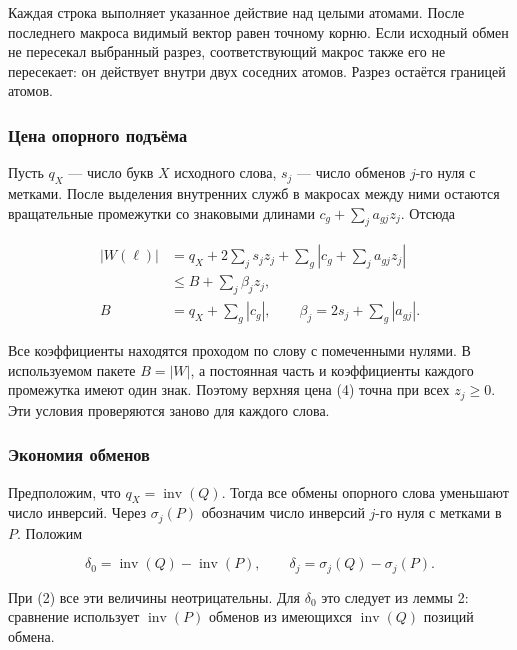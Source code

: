 \documentclass[
  11pt,
  a4paper,
]{article}
\begin{document}
Каждая строка выполняет указанное действие над целыми атомами. После
последнего макроса видимый вектор равен точному корню. Если исходный
обмен не пересекал выбранный разрез, соответствующий макрос также его не
пересекает: он действует внутри двух соседних атомов. Разрез остаётся
границей атомов.

\hypertarget{ux446ux435ux43dux430-ux43eux43fux43eux440ux43dux43eux433ux43e-ux43fux43eux434ux44aux451ux43cux430}{%
\subsubsection{Цена опорного
подъёма}\label{ux446ux435ux43dux430-ux43eux43fux43eux440ux43dux43eux433ux43e-ux43fux43eux434ux44aux451ux43cux430}}

Пусть \(q_X\) --- число букв \(X\) исходного слова, \(s_j\) --- число
обменов \(j\)-го нуля с метками. После выделения внутренних служб в
макросах между ними остаются вращательные промежутки со знаковыми
длинами \(c_g+\sum_j a_{gj}z_j\). Отсюда

\[\begin{aligned}
|W(\ell)|&=q_X+2\sum_js_jz_j+
\sum_g\left|c_g+\sum_ja_{gj}z_j\right|\\
&\le B+\sum_j\beta_jz_j,\\
B&=q_X+\sum_g|c_g|,\qquad
\beta_j=2s_j+\sum_g|a_{gj}|.
\end{aligned}\tag{4}\]

Все коэффициенты находятся проходом по слову с помеченными нулями. В
используемом пакете \(B=|W|\), а постоянная часть и коэффициенты каждого
промежутка имеют один знак. Поэтому верхняя цена (4) точна при всех
\(z_j\ge0\). Эти условия проверяются заново для каждого слова.

\hypertarget{ux44dux43aux43eux43dux43eux43cux438ux44f-ux43eux431ux43cux435ux43dux43eux432}{%
\subsubsection{Экономия
обменов}\label{ux44dux43aux43eux43dux43eux43cux438ux44f-ux43eux431ux43cux435ux43dux43eux432}}

Предположим, что \(q_X=\operatorname{inv}(Q)\). Тогда все обмены
опорного слова уменьшают число инверсий. Через \(\sigma_j(P)\) обозначим
число инверсий \(j\)-го нуля с метками в \(P\). Положим

\[\delta_0=\operatorname{inv}(Q)-\operatorname{inv}(P),\qquad
\delta_j=\sigma_j(Q)-\sigma_j(P).\tag{5}\]

При (2) все эти величины неотрицательны. Для \(\delta_0\) это следует из
леммы 2: сравнение использует \(\operatorname{inv}(P)\) обменов из
имеющихся \(\operatorname{inv}(Q)\) позиций обмена.
\end{document}
